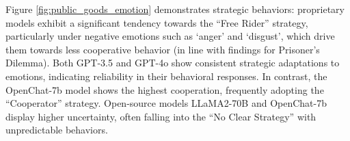 \documentclass{article}
\begin{document}






Figure \ref{fig:public_goods_emotion} demonstrates strategic behaviors: proprietary models exhibit a significant tendency towards the ``Free Rider'' strategy, particularly under negative emotions such as `anger' and `disgust', which drive them towards less cooperative behavior (in line with findings for Prisoner's Dilemma). Both GPT-3.5 and GPT-4o show consistent strategic adaptations to emotions, indicating reliability in their behavioral responses. In contrast, the OpenChat-7b model shows the highest cooperation, frequently adopting the ``Cooperator'' strategy. Open-source models LLaMA2-70B and OpenChat-7b display higher uncertainty, often falling into the ``No Clear Strategy'' with unpredictable behaviors. 

\vspace*{-5mm}
\end{document}
